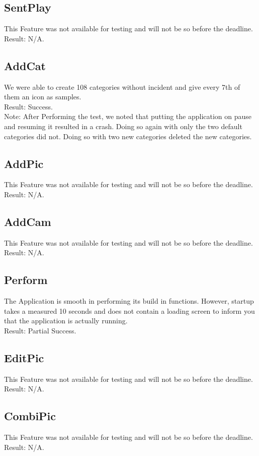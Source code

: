 \subsection*{SentPlay}
This Feature was not available for testing and will not be so before the deadline.\\

Result: N/A.

\subsection*{AddCat}
We were able to create 108 categories without incident and give every 7th of them an icon as samples.\\

Result: Success.\\

Note: After Performing the test, we noted that putting the application on pause and resuming it resulted in a crash. Doing so again with only the two default categories did not. Doing so with two new categories deleted the new categories.

\subsection*{AddPic}
This Feature was not available for testing and will not be so before the deadline.\\

Result: N/A.

\subsection*{AddCam}
This Feature was not available for testing and will not be so before the deadline.\\

Result: N/A.

\subsection*{Perform}
The Application is smooth in performing its build in functions.
However, startup takes a measured  10 seconds and does not contain a loading screen to inform you that the application is actually running.\\

Result: Partial Success.

\subsection*{EditPic}
This Feature was not available for testing and will not be so before the deadline.\\

Result: N/A.

\subsection*{CombiPic}
This Feature was not available for testing and will not be so before the deadline.\\

Result: N/A.